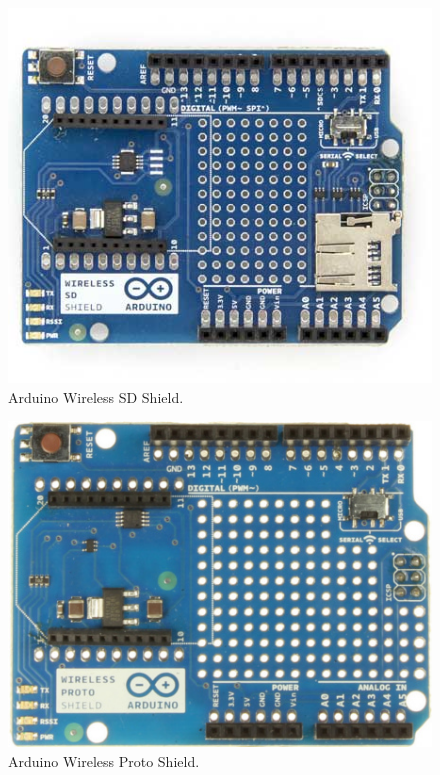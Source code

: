   \begin{figure}[htbp]
   \centering
   \includegraphics[scale=0.4,keepaspectratio=true]{./imagenes/arduino-wireless-shield.jpg}
   \caption{Arduino Wireless SD Shield.}
   \label{figura:ArduinoWirelessShield}
  \end{figure}

  \begin{figure}[htbp]
   \centering
   \includegraphics[scale=0.4,keepaspectratio=true]{./imagenes/arduino-wireless-proto-shield.jpg}
   \caption{Arduino Wireless Proto Shield.}
   \label{figura:ArduinoWirelessProtoShield}
  \end{figure}

